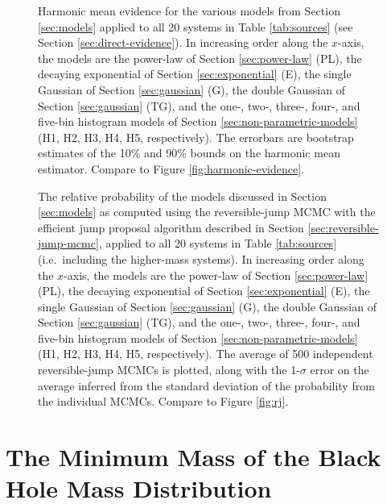 \documentclass[preprint]{aastex}
\begin{document}
\begin{figure}
  \begin{center}
  \end{center}
  \caption{\label{fig:high-harmonic-evidence} Harmonic mean evidence
    for the various models from Section \ref{sec:models} applied to
    all 20 systems in Table \ref{tab:sources} (see Section
    \ref{sec:direct-evidence}).  In increasing order along the
    $x$-axis, the models are the power-law of Section
    \ref{sec:power-law} (PL), the decaying exponential of Section
    \ref{sec:exponential} (E), the single Gaussian of Section
    \ref{sec:gaussian} (G), the double Gaussian of Section
    \ref{sec:gaussian} (TG), and the one-, two-, three-, four-, and
    five-bin histogram models of Section
    \ref{sec:non-parametric-models} (H1, H2, H3, H4, H5,
    respectively).  The errorbars are bootstrap estimates of the 10\%
    and 90\% bounds on the harmonic mean estimator.  Compare to Figure
    \ref{fig:harmonic-evidence}.}
\end{figure}

\begin{figure}
  \begin{center}
  \end{center}
  \caption{\label{fig:high-rj-evidence} The relative probability of
    the models discussed in Section \ref{sec:models} as computed using
    the reversible-jump MCMC with the efficient jump proposal
    algorithm described in Section \ref{sec:reversible-jump-mcmc},
    applied to all 20 systems in Table \ref{tab:sources} (i.e.\
    including the higher-mass systems).  In increasing order along the
    $x$-axis, the models are the power-law of Section
    \ref{sec:power-law} (PL), the decaying exponential of Section
    \ref{sec:exponential} (E), the single Gaussian of Section
    \ref{sec:gaussian} (G), the double Gaussian of Section
    \ref{sec:gaussian} (TG), and the one-, two-, three-, four-, and
    five-bin histogram models of Section
    \ref{sec:non-parametric-models} (H1, H2, H3, H4, H5,
    respectively).  The average of 500 independent reversible-jump
    MCMCs is plotted, along with the 1-$\sigma$ error on the average
    inferred from the standard deviation of the probability from the
    individual MCMCs.  Compare to Figure \ref{fig:rj}.}
\end{figure}


\section{The Minimum Mass of the Black Hole Mass Distribution}
\label{sec:minimum-mass}
\end{document}
